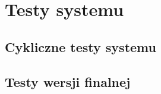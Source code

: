 \chapter{Testy systemu}
\label{cha:tests}

\section{Cykliczne testy systemu}

\section{Testy wersji finalnej}
